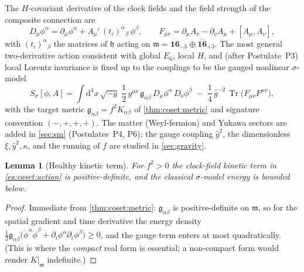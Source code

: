 \documentclass[11pt]{article}
\theoremstyle{plain}
\newtheorem{lemma}[theorem]{Lemma}
\theoremstyle{definition}
\theoremstyle{remark}
\newcommand{\Tr}{\operatorname{Tr}}
\newcommand{\dd}{\mathrm{d}}
\begin{document}
The $H$-covariant derivative of the clock fields and the field strength of the
composite connection are
\begin{equation}\label{eq:coset:covD}
  D_{\mu}\phi^{\alpha}
    = \partial_{\mu}\phi^{\alpha}
      + A_{\mu}{}^{i}\,(t_{i})^{\alpha}{}_{\beta}\,\phi^{\beta},
  \qquad
  F_{\mu\nu}
    = \partial_{\mu}A_{\nu} - \partial_{\nu}A_{\mu} + [A_{\mu},A_{\nu}],
\end{equation}
with $(t_{i})^{\alpha}{}_{\beta}$ the matrices of $\mathfrak h$ acting on
$\mathfrak m = \mathbf{16}_{-3}\oplus\overline{\mathbf{16}}_{+3}$. The most
general two-derivative action consistent with global $E_{6}$, local $H$, and
(after Postulate~P3) local Lorentz invariance is fixed up to the couplings to be
the gauged nonlinear $\sigma$-model
\begin{equation}\label{eq:coset:action}
  S_{\sigma}[\phi,A]
   = \int \dd^{4}x\,\sqrt{-g}\;
     \frac12\, g^{\mu\nu}\,\mathfrak g_{\alpha\beta}\,
       D_{\mu}\phi^{\alpha}\,D_{\nu}\phi^{\beta}
     \;-\;\frac14\,\hat g^{-2}\,\Tr\!\bigl(F_{\mu\nu}F^{\mu\nu}\bigr),
\end{equation}
with the target metric $\mathfrak g_{\alpha\beta} = f^{2}K_{\alpha\beta}$ of
\autoref{thm:coset:metric} and signature convention $(-,+,+,+)$. The matter
(Weyl-fermion) and Yukawa sectors are added in
\autoref{sec:sm} (Postulates~P4, P6); the gauge coupling $\hat g^{2}$,
the dimensionless $\xi,\hat y^{2},\kappa$, and the running of $f$ are studied in
\autoref{sec:gravity}.

\begin{lemma}[Healthy kinetic term]\label{lem:coset:positivity}
For $f^{2}>0$ the clock-field kinetic term in \eqref{eq:coset:action} is
positive-definite, and the classical $\sigma$-model energy is bounded below.
\end{lemma}

\begin{proof}
Immediate from \autoref{thm:coset:metric}: $\mathfrak g_{\alpha\beta}$ is
positive-definite on $\mathfrak m$, so for the spatial gradient and time
derivative the energy density
$\tfrac12\mathfrak g_{\alpha\beta}\bigl(\dot\phi^{\alpha}\dot\phi^{\beta}
+\partial_{i}\phi^{\alpha}\partial_{i}\phi^{\beta}\bigr)\ge 0$, and the gauge
term enters at most quadratically. (This is where the \emph{compact} real form
is essential; a non-compact form would render $K|_{\mathfrak m}$ indefinite.)
\end{proof}

\end{document}
